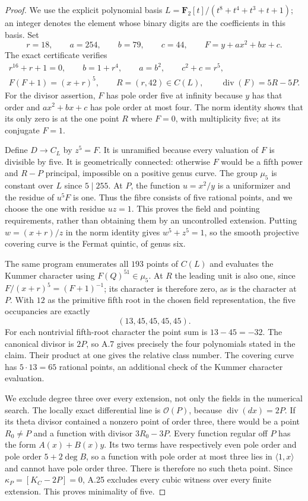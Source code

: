 \documentclass[11pt]{article}
\begin{document}
\begin{proof}
We use the explicit polynomial basis
$L=\mathbf F_2[t]/(t^8+t^4+t^3+t+1)$; an integer denotes the element
whose binary digits are the coefficients in this basis.  Set
\[
            r=18,\qquad a=254,\qquad b=79,\qquad c=44,
            \qquad F=y+a x^2+b x+c.
\]
The exact certificate  verifies
\[
 \begin{gathered}
 r^{16}+r+1=0,
 \qquad b=1+r^4,\qquad a=b^2,\qquad c^2+c=r^5,\\
 F(F+1)=(x+r)^5,
 \qquad R=(r,42)\in C(L),
 \qquad \operatorname{div}(F)=5R-5P.
 \end{gathered}
\]
For the divisor assertion, $F$ has pole order five at infinity because
$y$ has that order and $a x^2+b x+c$ has pole order at most four.
The norm identity shows that its only zero is at the one point $R$
where $F=0$, with multiplicity five; at its conjugate $F=1$.

Define $D\to C_L$ by $z^5=F$.  It is unramified because every valuation
of $F$ is divisible by five.  It is geometrically connected: otherwise
$F$ would be a fifth power and $R-P$ principal, impossible on a positive
genus curve.  The group $\mu_5$ is constant over $L$ since $5\mid255$.
At $P$, the function $u=x^2/y$ is a uniformizer and the residue of
$u^5F$ is one.  Thus the fibre consists of five rational points, and we
choose the one with residue $uz=1$.  This proves the field and pointing
requirements, rather than obtaining them by an uncontrolled extension.
Putting $w=(x+r)/z$ in the norm identity gives
$w^5+z^5=1$, so the smooth projective covering curve is the Fermat
quintic, of genus six.

The same program enumerates all $193$ points of $C(L)$ and evaluates
the Kummer character using $F(Q)^{51}\in\mu_5$.
At $R$ the leading unit is also one, since
$F/(x+r)^5=(F+1)^{-1}$; its character is therefore zero, as is the
character at $P$.  With $12$ as the primitive fifth root in the chosen
field representation, the five occupancies are exactly
\[
                          (13,45,45,45,45).
\]
For each nontrivial fifth-root character the point sum is $13-45=-32$.
The canonical divisor is $2P$, so A.7 gives precisely the four
polynomials stated in the claim.  Their product at one gives the
relative class number.  The covering curve has $5\cdot13=65$ rational
points, an additional check of the Kummer character evaluation.

We exclude degree three over every extension, not only the fields in
the numerical search.  The locally exact differential line is
$\mathcal O(P)$, because $\operatorname{div}(dx)=2P$.
If its theta divisor contained a nonzero point of order three, there
would be a point $R_0\ne P$ and a function with divisor $3R_0-3P$.
Every function regular off $P$ has the form $A(x)+B(x)y$.
Its two terms have respectively even pole order and pole order
$5+2\deg B$, so a function with pole order at most three lies in
$\langle1,x\rangle$ and cannot have pole order three.
There is therefore no such theta point.  Since
$\kappa_P=[K_C-2P]=0$, A.25 excludes every cubic witness over every
finite extension.  This proves minimality of five.


\end{proof}
\end{document}

